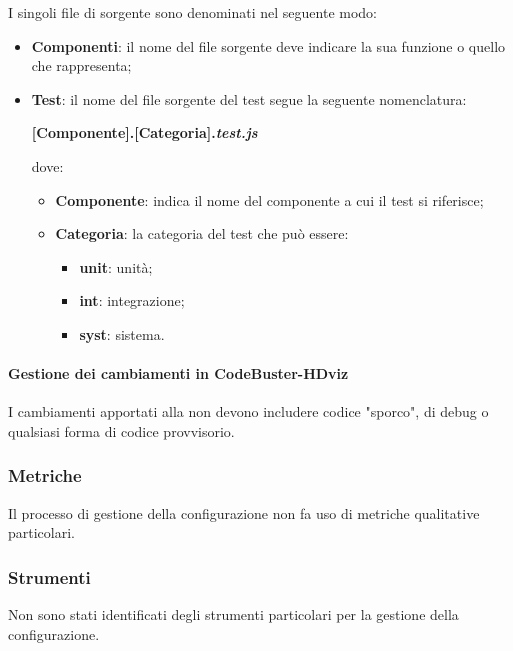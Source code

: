 I singoli file di sorgente sono denominati nel seguente modo:
\begin{itemize}
	\item \textbf{Componenti}: il nome del file sorgente deve indicare la sua funzione o quello che rappresenta;
	\item \textbf{Test}: il nome del file sorgente del test segue la seguente nomenclatura:
	\begin{center}
		\textbf{[Componente].[Categoria].\textit{test.js}}
	\end{center}
	
	dove:
	\begin{itemize}
		\item \textbf{Componente}: indica il nome del componente a cui il test si riferisce;
		
		\item \textbf{Categoria}: la categoria del test che può essere:
		\begin{itemize}
			\item \textbf{unit}: unità;
			
			\item \textbf{int}: integrazione;
			
			\item \textbf{syst}: sistema.
		\end{itemize}
	\end{itemize}
\end{itemize}

\paragraph{Gestione dei cambiamenti in CodeBuster-HDviz}
I cambiamenti apportati alla  non devono includere codice "sporco", di debug o qualsiasi forma di codice provvisorio.

\subsubsection{Metriche}
Il processo di gestione della configurazione non fa uso di metriche qualitative particolari.

\subsubsection{Strumenti}
Non sono stati identificati degli strumenti particolari per la gestione della configurazione.